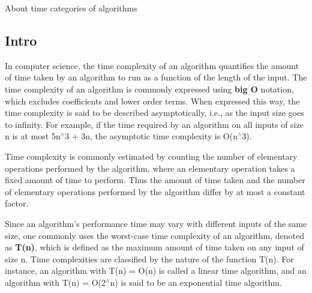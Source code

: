 About time categories of algorithms

\par
\par
\par
\hypertarget{time_complexity_tc_intro}{}\subsection{Intro}\label{time_complexity_tc_intro}
In computer science, the time complexity of an algorithm quantifies the amount of time taken by an algorithm to run as a function of the length of the input. The time complexity of an algorithm is commonly expressed using {\bfseries big O} notation, which excludes coefficients and lower order terms. When expressed this way, the time complexity is said to be described asymptotically, i.\-e., as the input size goes to infinity. For example, if the time required by an algorithm on all inputs of size {\ttfamily n} is at most {\ttfamily 5n$^\wedge$3 + 3n}, the asymptotic time complexity is {\ttfamily O(n$^\wedge$3)}.

Time complexity is commonly estimated by counting the number of elementary operations performed by the algorithm, where an elementary operation takes a fixed amount of time to perform. Thus the amount of time taken and the number of elementary operations performed by the algorithm differ by at most a constant factor.

Since an algorithm’s performance time may vary with different inputs of the same size, one commonly uses the worst-\/case time complexity of an algorithm, denoted as {\bfseries T(n)}, which is defined as the maximum amount of time taken on any input of size {\ttfamily n}. Time complexities are classified by the nature of the function {\ttfamily T(n)}. For instance, an algorithm with {\ttfamily T(n) = O(n)} is called a linear time algorithm, and an algorithm with {\ttfamily T(n) = O(2$^\wedge$n)} is said to be an exponential time algorithm.

